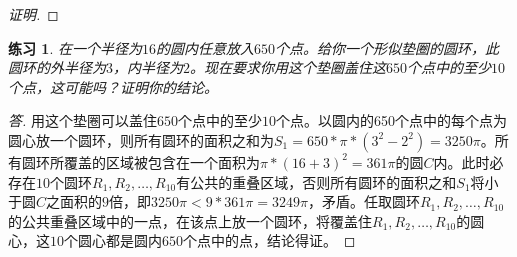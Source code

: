 \documentclass{article}
\newtheorem{Exercise}{练习}
\begin{document}
\begin{CJK*}{UTF8}{gbsn}
\begin{proof}[证明]
  \end{proof}
    \begin{Exercise}
    在一个半径为$16$的圆内任意放入$650$个点。给你一个形似垫圈的圆环，此圆环的外半径为$3$，内半径为$2$。现在要求你用这个垫圈盖住这$650$个点中的至少$10$个点，这可能吗？证明你的结论。
  \end{Exercise}
\begin{proof}[答]
  用这个垫圈可以盖住$650$个点中的至少$10$个点。以圆内的650个点中的每个点为圆心放一个圆环，则所有圆环的面积之和为$S_1 = 650 * \pi * (3^2 - 2^2) = 3250\pi$。所有圆环所覆盖的区域被包含在一个面积为$\pi * (16 + 3)^2= 361\pi$的圆$C$内。此时必存在$10$个圆环$R_1,R_2,\ldots, R_{10}$有公共的重叠区域，否则所有圆环的面积之和$S_1$将小于圆$C$之面积的$9$倍，即$3250\pi < 9 * 361\pi = 3249\pi$，矛盾。任取圆环$R_1,R_2,\ldots, R_{10}$的公共重叠区域中的一点，在该点上放一个圆环，将覆盖住$R_1,R_2,\ldots,R_{10}$的圆心，这$10$个圆心都是圆内$650$个点中的点，结论得证。 
\end{proof}




\end{CJK*}
\end{document}

